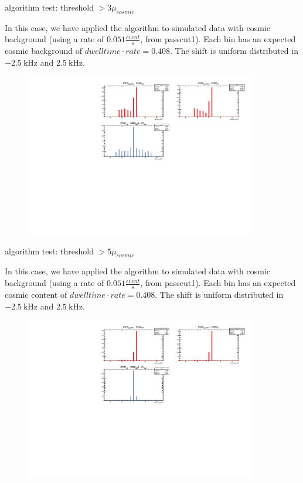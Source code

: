 \documentclass[8pt]{beamer}
\begin{document}
\begin{frame}{algorithm test: threshold $ > 3 \mu_{cosmic}$}

In this case, we have applied the algorithm to simulated data with cosmic background (using a rate of $0.051 \frac{event}{s}$, from passcut1). Each bin has an expected cosmic background of $dwelltime \cdot rate = 0.408$.
The shift is uniform distributed in $\SI{-2.5}{\kilo \hertz}$ and $\SI{+2.5}{\kilo \hertz}$. 
\begin{figure}
\includegraphics[width = 0.9\textwidth]{../Plot/OnsetResult11.pdf}
\end{figure}
\end{frame}

\begin{frame}{algorithm test: threshold $ > 5 \mu_{cosmic}$}

In this case, we have applied the algorithm to simulated data with cosmic background (using a rate of $0.051 \frac{event}{s}$, from passcut1). Each bin has an expected cosmic content of $dwelltime \cdot rate = 0.408$.
The shift is uniform distributed in $\SI{-2.5}{\kilo \hertz}$ and $\SI{+2.5}{\kilo \hertz}$. 
\begin{figure}
\includegraphics[width = 0.9\textwidth]{../Plot/OnsetResult12.pdf}
\end{figure}

\end{frame}
\end{document}

